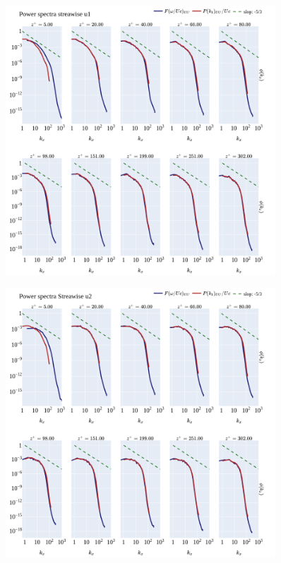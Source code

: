\documentclass[]{article}
\theoremstyle{plain}
\theoremstyle{remark}
\begin{document}
\begin{figure}[h!]
	\begin{center}
		\includegraphics[width=0.9\textwidth]{../output/split_time/frozen_turbulence/power_spectra/u1_all.png}
	\end{center}
\end{figure}

\begin{figure}[h!]
	\begin{center}
		\includegraphics[width=0.9\textwidth]{../output/split_time/frozen_turbulence/power_spectra/u2_all.png}
	\end{center}
\end{figure}
\end{document}
